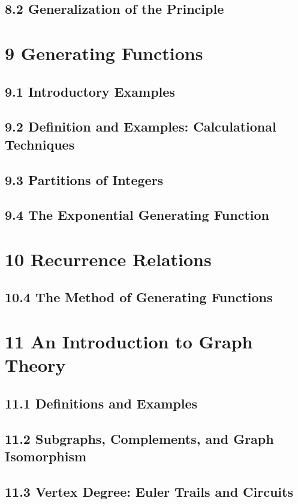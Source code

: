 \documentclass[a4paper]{article}
\begin{document}
\subsection*{8.2 Generalization of the Principle}

\section*{9 Generating Functions}
\subsection*{9.1 Introductory Examples}
\subsection*{9.2 Definition and Examples: Calculational Techniques}
\subsection*{9.3 Partitions of Integers}
\subsection*{9.4 The Exponential Generating Function}

\section*{10 Recurrence Relations}
\subsection*{10.4 The Method of Generating Functions}

\section*{11 An Introduction to Graph Theory}
\subsection*{11.1 Definitions and Examples}
\subsection*{11.2 Subgraphs, Complements, and Graph Isomorphism}
\subsection*{11.3 Vertex Degree: Euler Trails and Circuits}
\end{document}
